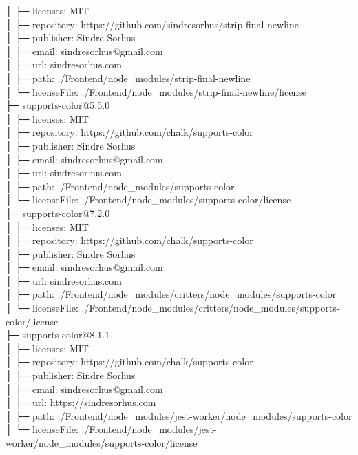 │  ├─ licenses: MIT\\
│  ├─ repository: https://github.com/sindresorhus/strip-final-newline\\
│  ├─ publisher: Sindre Sorhus\\
│  ├─ email: sindresorhus@gmail.com\\
│  ├─ url: sindresorhus.com\\
│  ├─ path: ./Frontend/node\_modules/strip-final-newline\\
│  └─ licenseFile: ./Frontend/node\_modules/strip-final-newline/license\\
├─ supports-color@5.5.0\\
│  ├─ licenses: MIT\\
│  ├─ repository: https://github.com/chalk/supports-color\\
│  ├─ publisher: Sindre Sorhus\\
│  ├─ email: sindresorhus@gmail.com\\
│  ├─ url: sindresorhus.com\\
│  ├─ path: ./Frontend/node\_modules/supports-color\\
│  └─ licenseFile: ./Frontend/node\_modules/supports-color/license\\
├─ supports-color@7.2.0\\
│  ├─ licenses: MIT\\
│  ├─ repository: https://github.com/chalk/supports-color\\
│  ├─ publisher: Sindre Sorhus\\
│  ├─ email: sindresorhus@gmail.com\\
│  ├─ url: sindresorhus.com\\
│  ├─ path: ./Frontend/node\_modules/critters/node\_modules/supports-color\\
│  └─ licenseFile: ./Frontend/node\_modules/critters/node\_modules/supports-color/license\\
├─ supports-color@8.1.1\\
│  ├─ licenses: MIT\\
│  ├─ repository: https://github.com/chalk/supports-color\\
│  ├─ publisher: Sindre Sorhus\\
│  ├─ email: sindresorhus@gmail.com\\
│  ├─ url: https://sindresorhus.com\\
│  ├─ path: ./Frontend/node\_modules/jest-worker/node\_modules/supports-color\\
│  └─ licenseFile: ./Frontend/node\_modules/jest-worker/node\_modules/supports-color/license\\
